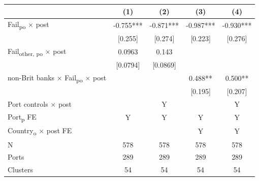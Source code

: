 {
\def\sym#1{\ifmmode^{#1}\else\(^{#1}\)\fi}
\begin{tabular}{l*{4}{c}}
\toprule
            &\multicolumn{1}{c}{(1)}   &\multicolumn{1}{c}{(2)}   &\multicolumn{1}{c}{(3)}   &\multicolumn{1}{c}{(4)}   \\
\midrule
Fail\textsubscript{po} $\times$ post&      -0.755***&      -0.871***&      -0.987***&      -0.930***\\
            &     [0.255]   &     [0.274]   &     [0.223]   &     [0.276]   \\
Fail\textsubscript{other, po} $\times$ post&      0.0963   &       0.143   &               &               \\
            &    [0.0794]   &    [0.0869]   &               &               \\
non-Brit banks $\times$ Fail\textsubscript{po} $\times$ post&               &               &       0.488** &       0.500** \\
            &               &               &     [0.195]   &     [0.207]   \\
Port controls $\times$ post &               &           Y   &               &           Y   \\
Port\textsubscript{p} FE &           Y   &           Y   &           Y   &           Y   \\
Country\textsubscript{o} $\times$ post FE&               &               &           Y   &           Y   \\
\midrule
N           &         578   &         578   &         578   &         578   \\
Ports       &         289   &         289   &         289   &         289   \\
Clusters    &          54   &          54   &          54   &          54   \\
\bottomrule
\end{tabular}
}
